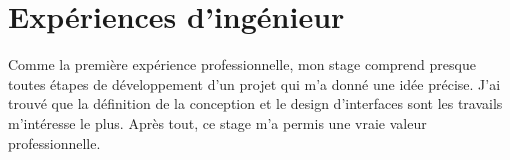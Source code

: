 \section{Expériences d'ingénieur}

Comme la première expérience professionnelle, mon stage comprend presque toutes étapes de développement d'un projet qui m'a donné une idée précise. J'ai trouvé que la définition de la conception et le design d'interfaces sont les travails m'intéresse le plus. Après tout, ce stage m'a permis une vraie valeur professionnelle.